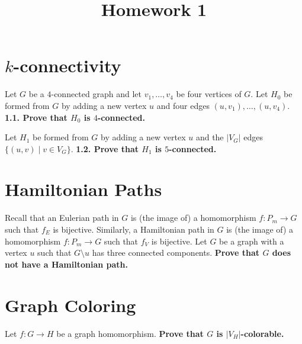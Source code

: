 \documentclass{article}
\title{Homework 1}
\author{}
\begin{document}
  \maketitle

  \section{$k$-connectivity}
    Let $G$ be a $4$-connected graph and let $v_1,\ldots, v_4$ be four vertices of $G$.
    Let $H_0$ be formed from $G$ by adding a new vertex $u$ and four edges $(u,v_1), \ldots , (u,v_4)$.
    \textbf{1.1. Prove that $H_0$ is $4$-connected.}

    Let $H_1$ be formed from $G$ by adding a new vertex $u$ and the $|V_G|$ edges $\{(u,v) \mid v\in V_G\}$.
    \textbf{1.2. Prove that $H_1$ is $5$-connected.}


  \section{Hamiltonian Paths}
  Recall that an Eulerian path in $G$ is (the image of) a homomorphism $f:P_m\to G$ such that $f_E$ is bijective.
  Similarly, a Hamiltonian path in $G$ is (the image of) a homomorphism $f:P_m\to G$ such that $f_V$ is bijective.
  Let $G$ be a graph with a vertex $u$ such that $G\setminus u$ has three connected components.
  \textbf{Prove that $G$ does not have a Hamiltonian path.}

  \section{Graph Coloring}
    Let $f:G\to H$ be a graph homomorphism.
    \textbf{Prove that $G$ is $|V_H|$-colorable.}

    
\end{document}
